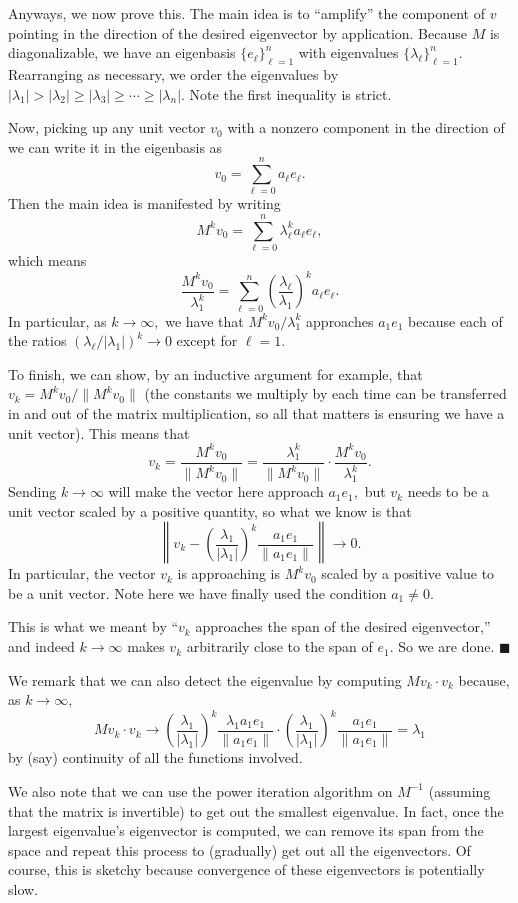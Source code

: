 Anyways, we now prove this. The main idea is to ``amplify'' the component of $v$ pointing in the direction of the desired eigenvector by application. Because $M$ is diagonalizable, we have an eigenbasis $\{e_\ell\}_{\ell=1}^n$ with eigenvalues $\{\lambda_\ell\}_{\ell=1}^n.$ Rearranging as necessary, we order the eigenvalues by $|\lambda_1|>|\lambda_2|\ge|\lambda_3|\ge\cdots\ge|\lambda_n|.$ Note the first inequality is strict.

Now, picking up any unit vector $v_0$ with a nonzero component in the direction of  we can write it in the eigenbasis as
\[v_0=\sum_{\ell=0}^na_\ell e_\ell.\]
Then the main idea is manifested by writing
\[M^kv_0=\sum_{\ell=0}^n\lambda_\ell^ka_\ell e_\ell,\]
which means
\[\frac{M^kv_0}{\lambda_1^k}=\sum_{\ell=0}^n\left(\frac{\lambda_\ell}{\lambda_1}\right)^ka_\ell e_\ell.\]
In particular, as $k\to\infty,$ we have that $M^kv_0/\lambda_1^k$ approaches $a_1e_1$ because each of the ratios $(\lambda_\ell/|\lambda_1|)^k\to0$ except for $\ell=1.$

To finish, we can show, by an inductive argument for example, that $v_k=M^kv_0/\lVert M^kv_0\rVert$ (the constants we multiply by each time can be transferred in and out of the matrix multiplication, so all that matters is ensuring we have a unit vector). This means that
\[v_k=\frac{M^kv_0}{\lVert M^kv_0\rVert}=\frac{\lambda_1^k}{\lVert M^kv_0\rVert}\cdot\frac{M^kv_0}{\lambda_1^k}.\]
Sending $k\to\infty$ will make the vector here approach $a_1e_1,$ but $v_k$ needs to be a unit vector scaled by a positive quantity, so what we know is that
\[\left\lVert v_k-\left(\frac{\lambda_1}{|\lambda_1|}\right)^k\frac{a_1e_1}{\lVert a_1e_1\rVert}\right\rVert\to0.\]
In particular, the vector $v_k$ is approaching is $M^kv_0$ scaled by a positive value to be a unit vector. Note here we have finally used the condition $a_1\ne0.$

This is what we meant by ``$v_k$ approaches the span of the desired eigenvector,'' and indeed $k\to\infty$ makes $v_k$ arbitrarily close to the span of $e_1.$ So we are done. $\blacksquare$

We remark that we can also detect the eigenvalue by computing $Mv_k\cdot v_k$ because, as $k\to\infty,$
\[Mv_k\cdot v_k\to\left(\frac{\lambda_1}{|\lambda_1|}\right)^k\frac{\lambda_1 a_1e_1}{\lVert a_1e_1\rVert}\cdot\left(\frac{\lambda_1}{|\lambda_1|}\right)^k\frac{a_1e_1}{\lVert a_1e_1\rVert}=\lambda_1\]
by (say) continuity of all the functions involved.

We also note that we can use the power iteration algorithm on $M^{-1}$ (assuming that the matrix is invertible) to get out the smallest eigenvalue. In fact, once the largest eigenvalue's eigenvector is computed, we can remove its span from the space and repeat this process to (gradually) get out all the eigenvectors. Of course, this is sketchy because convergence of these eigenvectors is potentially slow.

